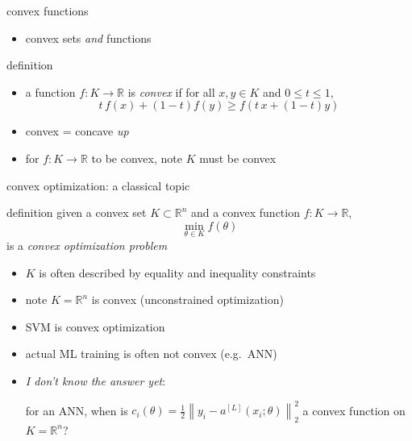 \documentclass[xcolor={svgnames},
               hyperref={colorlinks,citecolor=DeepPink4,linkcolor=FireBrick,urlcolor=Maroon},
               usepdftitle=false]  %
               {beamer}
\newcommand{\RR}{\mathbb{R}}
\begin{document}
\begin{frame}{convex functions}

\begin{itemize}
\item convex sets \emph{and} functions
\end{itemize}

\begin{block}{definition}
\begin{itemize}
\item a function $f:K \to \RR$ is \emph{convex} if for all $x,y \in K$ and $0 \le t \le 1$,
  $$t\, f(x) + (1-t) f(y) \ge f(t\, x + (1-t) y)$$
\end{itemize}
\end{block}

\begin{itemize}
\item convex = concave \emph{up}
\item for $f:K\to \RR$ to be convex, note $K$ must be convex
\end{itemize}
\end{frame}


\begin{frame}{convex optimization: a classical topic}

\begin{block}{definition}
given a convex set $K \subset \RR^n$ and a convex function $f:K\to \RR$,
    $$\min_{\theta \in K} f(\theta)$$
is a \emph{convex optimization problem}
\end{block}

\begin{itemize}
\item $K$ is often described by equality and inequality constraints
\item note $K=\RR^n$ is convex (unconstrained optimization)
\item SVM is convex optimization
\item actual ML training is often not convex (e.g.~ANN)
\item \emph{I don't know the answer yet}:

for an ANN, when is $c_i(\theta) = \frac{1}{2} \left\|y_i - a^{[L]}(x_i; \theta)\right\|_2^2$ a convex function on $K = \RR^n$?
\end{itemize}
\end{frame}
\end{document}
